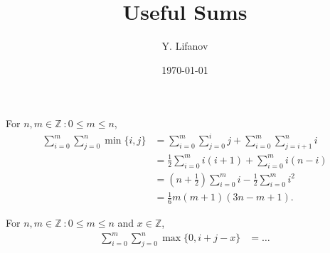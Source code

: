 \documentclass{article}
\begin{document}
  \title{Useful Sums}
  \author{Y. Lifanov}
  \date{\today}
  \maketitle

  For $n,m\in\mathbb{Z} \:: 0\leq m\leq n$,
  \begin{equation}
    \begin{aligned}
      \sum_{i = 0}^m\sum_{j = 0}^n\min\{i, j\} 
      &= 
      \sum_{i = 0}^m\sum_{j = 0}^i j + 
      \sum_{i = 0}^m\sum_{j = i + 1}^n i \\
      &= 
      \frac{1}{2}\sum_{i = 0}^m i(i + 1) + 
      \sum_{i = 0}^m i(n - i) \\
      &= 
      \left(n + \frac{1}{2}\right)\sum_{i = 0}^m i - 
      \frac{1}{2}\sum_{i = 0}^m i^2 \\
      &=
      \frac{1}{6}m(m + 1)\left(3n - m + 1\right).
    \end{aligned}
  \end{equation}

  For $n,m\in\mathbb{Z} \:: 0\leq m\leq n$ and $x\in\mathbb{Z}$,
  \begin{equation}
    \begin{aligned}
      \sum_{i = 0}^m\sum_{j = 0}^n\max\{0, i + j - x\} 
      &= 
      \dots
    \end{aligned}
  \end{equation}
\end{document}
